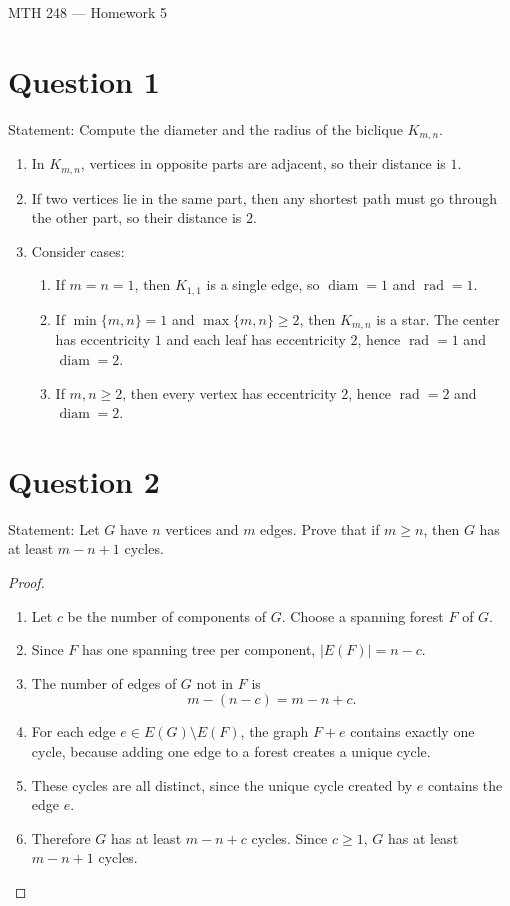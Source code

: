 \documentclass[11pt]{article}
\newcommand{\diam}{\operatorname{diam}}
\newcommand{\rad}{\operatorname{rad}}
\begin{document}
\begin{center}
{\Large MTH 248 --- Homework 5}
\end{center}

\section*{Question 1}
Statement: Compute the diameter and the radius of the biclique $K_{m,n}$.

\begin{enumerate}
\item In $K_{m,n}$, vertices in opposite parts are adjacent, so their distance is $1$.
\item If two vertices lie in the same part, then any shortest path must go through the other part, so their distance is $2$.
\item Consider cases:
\begin{enumerate}
\item If $m=n=1$, then $K_{1,1}$ is a single edge, so $\diam=1$ and $\rad=1$.
\item If $\min\{m,n\}=1$ and $\max\{m,n\}\ge 2$, then $K_{m,n}$ is a star. The center has eccentricity $1$ and each leaf has eccentricity $2$, hence $\rad=1$ and $\diam=2$.
\item If $m,n\ge 2$, then every vertex has eccentricity $2$, hence $\rad=2$ and $\diam=2$.
\end{enumerate}
\end{enumerate}

\newpage

\section*{Question 2}
Statement: Let $G$ have $n$ vertices and $m$ edges. Prove that if $m\ge n$, then $G$ has at least $m-n+1$ cycles.

\begin{proof}
~
\begin{enumerate}
\item Let $c$ be the number of components of $G$. Choose a spanning forest $F$ of $G$.
\item Since $F$ has one spanning tree per component, $|E(F)|=n-c$.
\item The number of edges of $G$ not in $F$ is
\[
m-(n-c)=m-n+c.
\]
\item For each edge $e\in E(G)\setminus E(F)$, the graph $F+e$ contains exactly one cycle, because adding one edge to a forest creates a unique cycle.
\item These cycles are all distinct, since the unique cycle created by $e$ contains the edge $e$.
\item Therefore $G$ has at least $m-n+c$ cycles. Since $c\ge 1$, $G$ has at least $m-n+1$ cycles.
\end{enumerate}
\end{proof}
\end{document}
